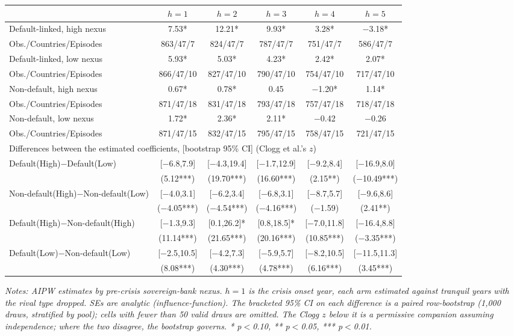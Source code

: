 \documentclass[12pt]{article}
\newcommand{\notes}[1]{\par\begingroup\footnotesize\itshape\justifying\noindent Notes: #1\par\endgroup}
\begin{document}
\begin{longtable}{lccccc}
\toprule
 & $h=1$ & $h=2$ & $h=3$ & $h=4$ & $h=5$ \\
\midrule
Default-linked, high nexus & 7.53* & 12.21* & 9.93* & 3.28* & $-$3.18* \\
Obs./Countries/Episodes & 863/47/7 & 824/47/7 & 787/47/7 & 751/47/7 & 586/47/7 \\[2pt]
Default-linked, low nexus & 5.93* & 5.03* & 4.23* & 2.42* & 2.07* \\
Obs./Countries/Episodes & 866/47/10 & 827/47/10 & 790/47/10 & 754/47/10 & 717/47/10 \\[2pt]
Non-default, high nexus & 0.67* & 0.78* & 0.45 & $-$1.20* & 1.14* \\
Obs./Countries/Episodes & 871/47/18 & 831/47/18 & 793/47/18 & 757/47/18 & 718/47/18 \\[2pt]
Non-default, low nexus & 1.72* & 2.36* & 2.11* & $-$0.42 & $-$0.26 \\
Obs./Countries/Episodes & 871/47/15 & 832/47/15 & 795/47/15 & 758/47/15 & 721/47/15 \\[4pt]
\multicolumn{6}{l}{Differences between the estimated coefficients, [bootstrap 95\% CI] (Clogg et al.'s $z$)} \\[2pt]
Default(High)$-$Default(Low) & [$-$6.8,7.9] & [$-$4.3,19.4] & [$-$1.7,12.9] & [$-$9.2,8.4] & [$-$16.9,8.0] \\
 & (5.12***) & (19.70***) & (16.60***) & (2.15**) & ($-$10.49***) \\[2pt]
Non-default(High)$-$Non-default(Low) & [$-$4.0,3.1] & [$-$6.2,3.4] & [$-$6.8,3.1] & [$-$8.7,5.7] & [$-$9.6,8.6] \\
 & ($-$4.05***) & ($-$4.54***) & ($-$4.16***) & ($-$1.59) & (2.41**) \\[6pt]
Default(High)$-$Non-default(High) & [$-$1.3,9.3] & [0.1,26.2]* & [0.8,18.5]* & [$-$7.0,11.8] & [$-$16.4,8.8] \\
 & (11.14***) & (21.65***) & (20.16***) & (10.85***) & ($-$3.35***) \\[2pt]
Default(Low)$-$Non-default(Low) & [$-$2.5,10.5] & [$-$4.2,7.3] & [$-$5.9,5.7] & [$-$8.2,10.5] & [$-$11.5,11.3] \\
 & (8.08***) & (4.30***) & (4.78***) & (6.16***) & (3.45***) \\
\bottomrule
\end{longtable}
\endgroup
\notes{AIPW estimates by pre-crisis sovereign-bank nexus. $h=1$ is the
crisis onset year, each arm estimated against tranquil years with the
rival type dropped. SEs are analytic (influence-function). The
bracketed 95\% CI on each difference is a paired row-bootstrap (1,000
draws, stratified by pool); cells with fewer than 50 valid draws are
omitted. The Clogg $z$ below it is a permissive companion assuming
independence; where the two disagree, the bootstrap governs.
* p$<$0.10, ** p$<$0.05, *** p$<$0.01.}
\end{document}
